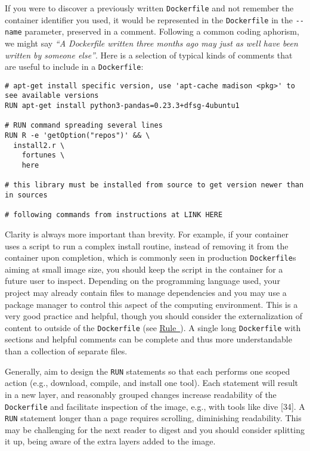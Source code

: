\documentclass[10pt,letterpaper]{article}
\begin{document}
If you were to discover a previously written \texttt{Dockerfile} and not
remember the container identifier you used, it would be represented in
the \texttt{Dockerfile} in the \texttt{-\/-name} parameter, preserved in
a comment. Following a common coding aphorism, we might say \emph{``A
Dockerfile written three months ago may just as well have been written
by someone else''}. Here is a selection of typical kinds of comments
that are useful to include in a \texttt{Dockerfile}:

\begin{verbatim}
# apt-get install specific version, use 'apt-cache madison <pkg>' to see available versions
RUN apt-get install python3-pandas=0.23.3+dfsg-4ubuntu1

# RUN command spreading several lines
RUN R -e 'getOption("repos")' && \
  install2.r \
    fortunes \
    here

# this library must be installed from source to get version newer than in sources

# following commands from instructions at LINK HERE
\end{verbatim}

Clarity is always more important than brevity. For example, if your
container uses a script to run a complex install routine, instead of
removing it from the container upon completion, which is commonly seen
in production \texttt{Dockerfile}s aiming at small image size, you
should keep the script in the container for a future user to inspect.
Depending on the programming language used, your project may already
contain files to manage dependencies and you may use a package manager
to control this aspect of the computing environment. This is a very good
practice and helpful, though you should consider the externalization of
content to outside of the \texttt{Dockerfile} (see
\hyperref[{rule:mount}]{Rule~\ztitleref{rule:mount}}). A single long
\texttt{Dockerfile} with sections and helpful comments can be complete
and thus more understandable than a collection of separate files.

Generally, aim to design the \texttt{RUN} statements so that each
performs one scoped action (e.g., download, compile, and install one
tool). Each statement will result in a new layer, and reasonably grouped
changes increase readability of the \texttt{Dockerfile} and facilitate
inspection of the image, e.g., with tools like dive {[}34{]}. A
\texttt{RUN} statement longer than a page requires scrolling,
diminishing readability. This may be challenging for the next reader to
digest and you should consider splitting it up, being aware of the extra
layers added to the image.
\end{document}

